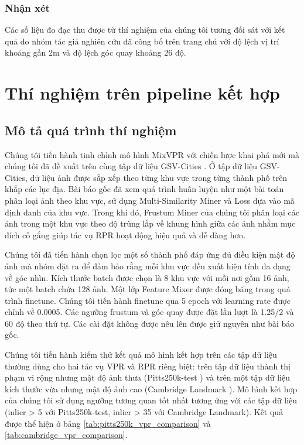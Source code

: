 \subsubsection*{Nhận xét}

Các số liệu đo đạc thu được từ thí nghiệm của chúng tôi tương đối sát với kết quả do nhóm tác giả nghiên cứu đã công bố trên trang chủ với độ lệch vị trí khoảng gần 2m và độ lệch góc quay khoảng 26 độ.

\section{Thí nghiệm trên pipeline kết hợp}
\subsection*{Mô tả quá trình thí nghiệm}

Chúng tôi tiến hành tinh chỉnh mô hình MixVPR \cite{alibey2023mixvpr} với chiến lược khai phá mới mà chúng tôi đã đề xuất trên cùng tập dữ liệu GSV-Cities \cite{Ali_bey_2022}. Ở tập dữ liệu GSV-Cities, dữ liệu ảnh được sắp xếp theo từng khu vực trong từng thành phố trên khắp các lục địa. Bài báo gốc đã xem quá trình huấn luyện như một bài toán phân loại ảnh theo khu vực, sử dụng Multi-Similarity Miner và Loss \cite{wang2019multi} dựa vào mã định danh của khu vực. Trong khi đó, Frustum Miner của chúng tôi phân loại các ảnh trong một khu vực theo độ trùng lắp về khung hình giữa các ảnh nhằm mục đích cố gắng giúp tác vụ RPR hoạt động hiệu quả và dễ dàng hơn.

Chúng tôi đã tiến hành chọn lọc một số thành phố đáp ứng đủ điều kiện mật độ ảnh mà nhóm đặt ra để đảm bảo rằng mỗi khu vực đều xuất hiện tính đa dạng về góc nhìn. Kích thước batch được chọn là 8 khu vực với mỗi nơi gồm 16 ảnh, tức một batch chứa 128 ảnh. Một lớp Feature Mixer được đóng băng trong quá trình finetune. Chúng tôi tiến hành finetune qua 5 epoch với learning rate được chỉnh về 0.0005. Các ngưỡng frustum và góc quay được đặt lần lượt là 1.25/2 và 60 độ theo thứ tự. Các cài đặt không được nêu lên được giữ nguyên như bài báo gốc.

Chúng tôi tiến hành kiểm thử kết quả mô hình kết hợp trên các tập dữ liệu thường dùng cho hai tác vụ VPR và RPR riêng biệt: trên tập dữ liệu thành thị phạm vi rộng nhưng mật độ ảnh thưa (Pitts250k-test \cite{6618963}) và trên một tập dữ liệu kích thước vừa nhưng mật độ ảnh cao (Cambridge Landmark \cite{kendall2016posenet}). Mô hình kết hợp của chúng tôi sử dụng ngưỡng tương quan tốt nhất tương ứng với các tập dữ liệu (inlier > 5 với Pitts250k-test, inlier > 35 với Cambridge Landmark). Kết quả được thể hiện ở bảng \ref{tab:pitts250k_vpr_comparison} và \ref{tab:cambridge_vpr_comparison}.

